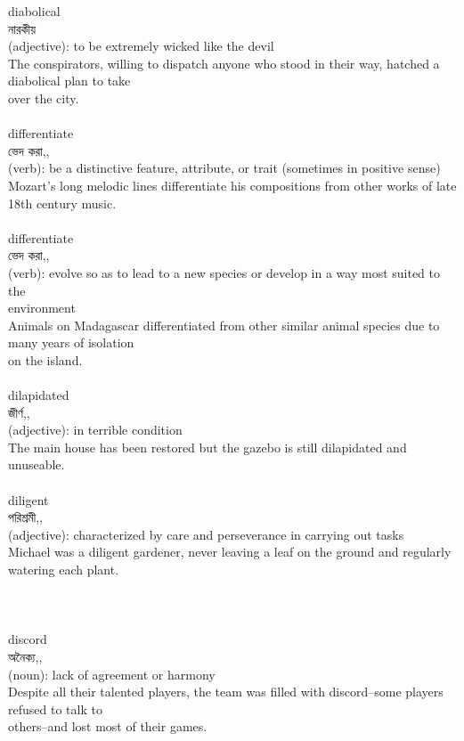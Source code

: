 \documentclass{article}
\begin{document}
{diabolical}\\
{নারকীয়}\\
{(adjective): to be extremely wicked like the devil\\The conspirators, willing to dispatch anyone who stood in their way, hatched a diabolical plan to take\\over the city.\\}\\
{differentiate}\\
{ভেদ করা,,}\\
{(verb): be a distinctive feature, attribute, or trait (sometimes in positive sense)\\Mozart's long melodic lines differentiate his compositions from other works of late 18th century music.\\}\\
{differentiate}\\
{ভেদ করা,,}\\
{(verb): evolve so as to lead to a new species or develop in a way most suited to the\\environment\\Animals on Madagascar differentiated from other similar animal species due to many years of isolation\\on the island.\\}\\
{dilapidated}\\
{জীর্ণ,,}\\
{(adjective): in terrible condition\\The main house has been restored but the gazebo is still dilapidated and unuseable.\\}\\
{diligent}\\
{পরিশ্রমী,,}\\
{(adjective): characterized by care and perseverance in carrying out tasks\\Michael was a diligent gardener, never leaving a leaf on the ground and regularly watering each plant.\\\\                                                                               \\}\\
{discord}\\
{অনৈক্য,,}\\
{(noun): lack of agreement or harmony\\Despite all their talented players, the team was filled with discord--some players refused to talk to\\others--and lost most of their games.\\}\\
\end{document}
